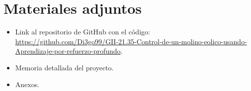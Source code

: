 \section{Materiales adjuntos}

\begin{itemize}
    \item Link al repositorio de GitHub con el código: \href{https://github.com/Di3go99/GII-21.35-Control-de-un-molino-eolico-usando-Aprendizaje-por-refuerzo-profundo}{https://github.com/Di3go99/GII-21.35-Control-de-un-molino-eolico-usando-Aprendizaje-por-refuerzo-profundo}.
    \item Memoria detallada del proyecto.
    \item Anexos.
\end{itemize}